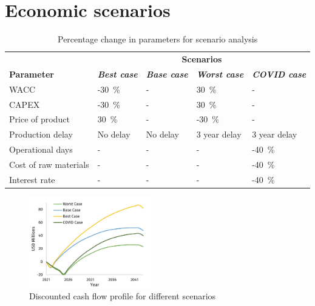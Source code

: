 
\section{Economic scenarios}

\begin{table}[H]
\centering
\caption{Percentage change in parameters for scenario analysis}
\label{tab:scenario_analysis}
\begin{tabular}{@{}l|llll@{}}
\toprule
                      & \multicolumn{4}{c}{\textbf{Scenarios}}                                                        \\
\textbf{Parameter}    & \textit{\textbf{Best case}} & \textit{\textbf{Base case}} & \textit{\textbf{Worst case}} & \textit{\textbf{COVID case}} \\ \midrule
WACC                  & -\SI{30}{\percent}                       & -                          & \SI{30}{\percent}                         & -                            \\
CAPEX                 & -\SI{30}{\percent}                       & -                          & \SI{30}{\percent}                         & -                            \\
Price of product      & \SI{30}{\percent}                        & -                          & -\SI{30}{\percent}                        & -                            \\
Production delay      & No delay                    & No delay                   & 3 year delay                 & 3 year delay                 \\
Operational days      & -                           & -                          & -                            & -\SI{40}{\percent}                        \\
Cost of raw materials & -                           & -                          & -                            & -\SI{40}{\percent}                        \\
Interest rate         & -                           & -                          & -                            & -\SI{40}{\percent}                        \\\bottomrule
\end{tabular}
\end{table}

\begin{figure}
    \vspace{-0.9cm}
    \caption{Discounted cash flow profile for different scenarios}
    \label{DCF_scenario}
    \includegraphics[width=0.47\textwidth]{chapters/6-economics/figures/DCF.jpg}
\end{figure}

